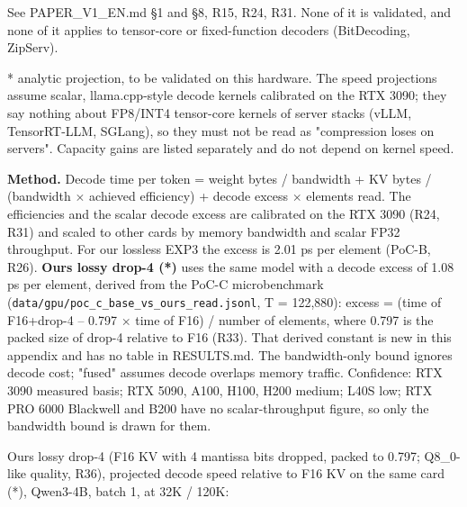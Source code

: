 \documentclass[10pt]{article}
\begin{document}
See PAPER\_V1\_EN.md \S{}1 and \S{}8, R15, R24, R31. None of it is validated, and none of it applies to tensor-core or
fixed-function decoders (BitDecoding, ZipServ).

* analytic projection, to be validated on this hardware. The speed projections assume scalar, llama.cpp-style decode kernels calibrated on the RTX 3090; they say nothing about FP8/INT4 tensor-core kernels of server stacks (vLLM, TensorRT-LLM, SGLang), so they must not be read as "compression loses on servers". Capacity gains are listed separately and do not depend on kernel speed.

\textbf{Method.} Decode time per token = weight bytes / bandwidth + KV bytes / (bandwidth $\times$ achieved efficiency) +
decode excess $\times$ elements read. The efficiencies and the scalar decode excess are calibrated on the RTX 3090
(R24, R31) and scaled to other cards by memory bandwidth and scalar FP32 throughput. For our lossless EXP3 the
excess is 2.01 ps per element (PoC-B, R26). \textbf{Ours lossy drop-4 (*)} uses the same model with a decode excess
of 1.08 ps per element, derived from the PoC-C microbenchmark (\texttt{data/gpu/poc\_c\_base\_vs\_ours\_read.jsonl},
T = 122,880): excess = (time of F16+drop-4 -- 0.797 $\times$ time of F16) / number of elements, where 0.797 is the packed
size of drop-4 relative to F16 (R33). That derived constant is new in this appendix and has no table in
RESULTS.md. The bandwidth-only bound ignores decode cost; "fused" assumes decode overlaps memory traffic.
Confidence: RTX 3090 measured basis; RTX 5090, A100, H100, H200 medium; L40S low; RTX PRO 6000 Blackwell and B200
have no scalar-throughput figure, so only the bandwidth bound is drawn for them.

Ours lossy drop-4 (F16 KV with 4 mantissa bits dropped, packed to 0.797; Q8\_0-like quality, R36), projected
decode speed relative to F16 KV on the same card (*), Qwen3-4B, batch 1, at 32K / 120K:


\begin{table}[h]\centering\scriptsize
{}
\end{table}
\end{document}
